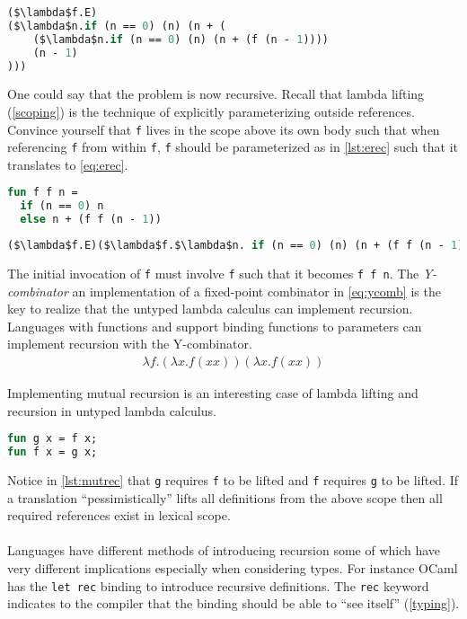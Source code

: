 \documentclass[11pt,oneside,a4paper]{report}
\begin{document}
\begin{lstlisting}[float,language=ML,caption={Recursive function f substituted},label={eq:naiverecdepth},mathescape=true]
($\lambda$f.E) 
($\lambda$n.if (n == 0) (n) (n + (
    ($\lambda$n.if (n == 0) (n) (n + (f (n - 1))))
    (n - 1)
)))
\end{lstlisting}
One could say that the problem is now recursive.
Recall that lambda lifting (\autoref{scoping}) is the technique of explicitly parameterizing outside references.
Convince yourself that \texttt{f} lives in the scope above its own body such that when referencing \texttt{f} from within \texttt{f}, \texttt{f} should be parameterized as in \autoref{lst:erec} such that it translates to \autoref{eq:erec}.
\begin{lstlisting}[float,language=ML,caption={Explicitly passing recursive function},label={lst:erec}]
fun f f n = 
  if (n == 0) n
  else n + (f f (n - 1))
\end{lstlisting}
\begin{lstlisting}[float,language=ML,caption={Explicitly passing recursive function in the lambda calculus},label={eq:erec},mathescape=true]
($\lambda$f.E)($\lambda$f.$\lambda$n. if (n == 0) (n) (n + (f f (n - 1))))
\end{lstlisting}
The initial invocation of \texttt{f} must involve \texttt{f} such that it becomes \texttt{f f n}.
The \textit{Y-combinator} an implementation of a fixed-point combinator in \autoref{eq:ycomb} is the key to realize that the untyped lambda calculus can implement recursion.
Languages with functions and support binding functions to parameters can implement recursion with the Y-combinator.
\begin{align}
    \lambda f . (\lambda x . f (x x)) (\lambda x . f (x x))
    \label{eq:ycomb}
\end{align}

Implementing mutual recursion is an interesting case of lambda lifting and recursion in untyped lambda calculus.
\begin{lstlisting}[float,language=ML,caption={Mutual recursion},label={lst:mutrec}]
fun g x = f x;
fun f x = g x;
\end{lstlisting}
Notice in \autoref{lst:mutrec} that \texttt{g} requires \texttt{f} to be lifted and \texttt{f} requires \texttt{g} to be lifted.
If a translation ``pessimistically'' lifts all definitions from the above scope then all required references exist in lexical scope.
\\\\
Languages have different methods of introducing recursion some of which have very different implications especially when considering types.
For instance OCaml has the \texttt{let rec} binding to introduce recursive definitions.
The \texttt{rec} keyword indicates to the compiler that the binding should be able to ``see itself'' (\autoref{typing}).
\end{document}
